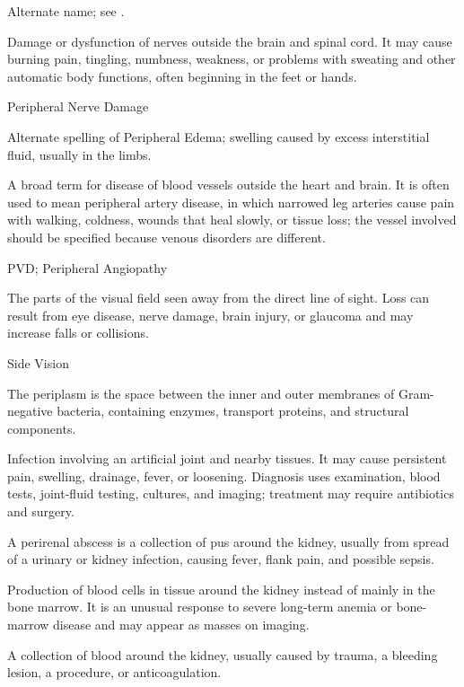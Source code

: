  Alternate name; see .

 Damage or dysfunction of nerves outside the brain and spinal cord. It may cause burning pain, tingling, numbness, weakness, or problems with sweating and other automatic body functions, often beginning in the feet or hands.

\synonyms
Peripheral Nerve Damage

 Alternate spelling of Peripheral Edema; swelling caused by excess interstitial fluid, usually in the limbs.

 A broad term for disease of blood vessels outside the heart and brain. It is often used to mean peripheral artery disease, in which narrowed leg arteries cause pain with walking, coldness, wounds that heal slowly, or tissue loss; the vessel involved should be specified because venous disorders are different.

\synonyms
PVD; Peripheral Angiopathy

 The parts of the visual field seen away from the direct line of sight. Loss can result from eye disease, nerve damage, brain injury, or glaucoma and may increase falls or collisions.

\synonyms
Side Vision

 The periplasm is the space between the inner and outer membranes of Gram-negative bacteria, containing enzymes, transport proteins, and structural components.

 Infection involving an artificial joint and nearby tissues. It may cause persistent pain, swelling, drainage, fever, or loosening. Diagnosis uses examination, blood tests, joint-fluid testing, cultures, and imaging; treatment may require antibiotics and surgery.

 A perirenal abscess is a collection of pus around the kidney, usually from spread of a urinary or kidney infection, causing fever, flank pain, and possible sepsis.

 Production of blood cells in tissue around the kidney instead of mainly in the bone marrow. It is an unusual response to severe long-term anemia or bone-marrow disease and may appear as masses on imaging.

 A collection of blood around the kidney, usually caused by trauma, a bleeding lesion, a procedure, or anticoagulation.

